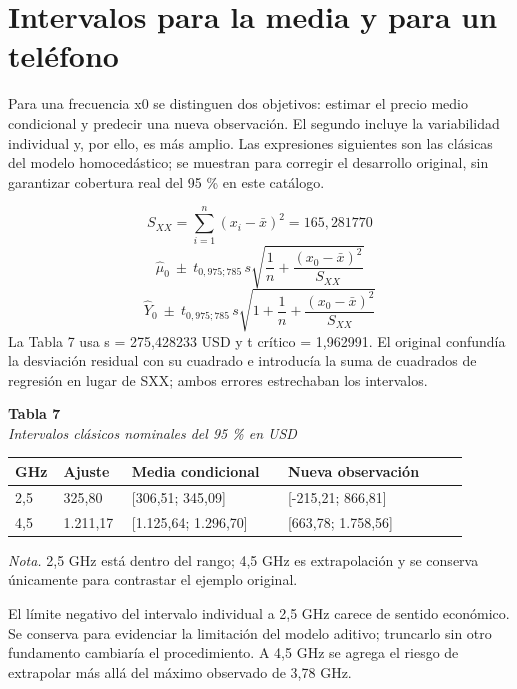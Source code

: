\documentclass[12pt,letterpaper]{article}
\begin{document}
\clearpage
\section*{Intervalos para la media y para un teléfono}
Para una frecuencia x0 se distinguen dos objetivos: estimar el precio medio condicional y predecir una nueva observación. El segundo incluye la variabilidad individual y, por ello, es más amplio. Las expresiones siguientes son las clásicas del modelo homocedástico; se muestran para corregir el desarrollo original, sin garantizar cobertura real del 95 \% en este catálogo.

\begin{equation*}S_{XX}=\sum_{i=1}^{n}(x_i-\bar{x})^2=165{,}281770\end{equation*}
\begin{equation*}\widehat{\mu}_0\ \pm\ t_{0{,}975;785}\,s\sqrt{\frac{1}{n}+\frac{(x_0-\bar{x})^2}{S_{XX}}}\end{equation*}
\begin{equation*}\widehat{Y}_0\ \pm\ t_{0{,}975;785}\,s\sqrt{1+\frac{1}{n}+\frac{(x_0-\bar{x})^2}{S_{XX}}}\end{equation*}
La Tabla 7 usa s = 275,428233 USD y t crítico = 1,962991. El original confundía la desviación residual con su cuadrado e introducía la suma de cuadrados de regresión en lugar de SXX; ambos errores estrechaban los intervalos.

\begin{center}\begin{minipage}{\linewidth}\textbf{Tabla 7}\\\textit{Intervalos clásicos nominales del 95 \% en USD}\\\begin{singlespace}\small
\begin{tabular}{@{}p{0.0641\linewidth}p{0.1325\linewidth}p{0.3291\linewidth}p{0.3718\linewidth}@{}}\toprule
\textbf{GHz} & \textbf{Ajuste} & \textbf{Media condicional} & \textbf{Nueva observación}\\\midrule
2,5 & 325,80 & [306,51; 345,09] & [-215,21; 866,81]\\
4,5 & 1.211,17 & [1.125,64; 1.296,70] & [663,78; 1.758,56]\\
\bottomrule\end{tabular}\end{singlespace}
\small\textit{Nota.} 2,5 GHz está dentro del rango; 4,5 GHz es extrapolación y se conserva únicamente para contrastar el ejemplo original.
\end{minipage}\end{center}
El límite negativo del intervalo individual a 2,5 GHz carece de sentido económico. Se conserva para evidenciar la limitación del modelo aditivo; truncarlo sin otro fundamento cambiaría el procedimiento. A 4,5 GHz se agrega el riesgo de extrapolar más allá del máximo observado de 3,78 GHz.
\end{document}
